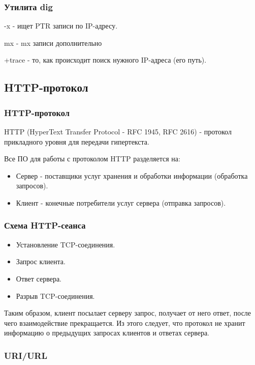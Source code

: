 \documentclass[a4paper,12pt]{article}
\begin{document}
	\subsubsection{Утилита dig}
	
	-x - ищет PTR записи по IP-адресу.
	
	mx - mx записи дополнительно
	
	+trace - то, как происходит поиск нужного IP-адреса (его путь).
	
	\subsection{HTTP-протокол}
	
	\subsubsection{HTTP-протокол}
	
	HTTP (HyperText Transfer Protocol - RFC 1945, RFC 2616) - протокол прикладного уровня для передачи гипертекста.
	
	Все ПО для работы с протоколом HTTP разделяется на:
	
	\begin{itemize}
		\item Сервер - поставщики услуг хранения и обработки информации (обработка запросов).
		\item Клиент - конечные потребители услуг сервера (отправка запросов).
	\end{itemize}
	
	\subsubsection{Схема HTTP-сеанса}
	
	\begin{itemize}
		\item Установление TCP-соединения.
		\item Запрос клиента.
		\item Ответ сервера.
		\item Разрыв TCP-соединения.
	\end{itemize}
	
	Таким образом, клиент посылает серверу запрос, получает от него ответ, после чего взаимодействие прекращается. Из этого следует, что протокол не хранит информацию о предыдущих запросах клиентов и ответах сервера.
	
	\subsubsection{URI/URL}
	
\end{document}
